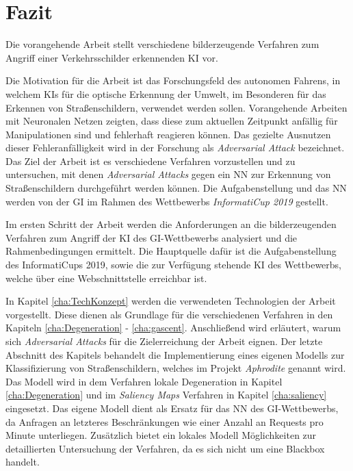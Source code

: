 \chapter{Fazit}
\label{cha:Fazit} \label{cha:Schluss}
Die vorangehende Arbeit stellt verschiedene bilderzeugende Verfahren zum Angriff einer Verkehrsschilder erkennenden \ac{KI} vor.

Die Motivation für die Arbeit ist das Forschungsfeld des autonomen Fahrens, in welchem \acp{KI} für die optische Erkennung der Umwelt, im Besonderen für das Erkennen von Straßenschildern, verwendet werden sollen. 
Vorangehende Arbeiten mit Neuronalen Netzen zeigten, dass diese zum aktuellen Zeitpunkt anfällig für Manipulationen sind und fehlerhaft reagieren können. 
Das gezielte Ausnutzen dieser Fehleranfälligkeit wird in der Forschung als \textit{Adversarial Attack} bezeichnet. 
Das Ziel der Arbeit ist es verschiedene Verfahren vorzustellen und zu untersuchen, mit denen \textit{Adversarial Attacks} gegen ein \ac{NN} zur Erkennung von Straßenschildern durchgeführt werden können. 
Die Aufgabenstellung und das \ac{NN} werden von der \acl{GI} im Rahmen des Wettbewerbs \textit{InformatiCup 2019} gestellt.

Im ersten Schritt der Arbeit werden die Anforderungen an die bilderzeugenden Verfahren zum Angriff der \ac{KI} des \ac{GI}-Wettbewerbs analysiert und die Rahmenbedingungen ermittelt. 
Die Hauptquelle dafür ist die Aufgabenstellung des InformatiCups 2019, sowie die zur Verfügung stehende \ac{KI} des Wettbewerbs, welche über eine Webschnittstelle erreichbar ist.

In Kapitel \ref{cha:TechKonzept} werden die verwendeten Technologien der Arbeit vorgestellt. 
Diese dienen als Grundlage für die verschiedenen Verfahren in den Kapiteln \ref{cha:Degeneration} - \ref{cha:gascent}. Anschließend wird erläutert, warum sich \textit{Adversarial Attacks} für die Zielerreichung der Arbeit eignen. 
Der letzte Abschnitt des Kapitels behandelt die Implementierung eines eigenen Modells zur Klassifizierung von Straßenschildern, welches im Projekt \textit{Aphrodite} genannt wird. 
Das Modell wird in dem Verfahren lokale Degeneration in Kapitel \ref{cha:Degeneration} und im \textit{Saliency Maps} Verfahren in Kapitel \ref{cha:saliency} eingesetzt. 
Das eigene Modell dient als Ersatz für das \ac{NN} des \ac{GI}-Wettbewerbs, da Anfragen an letzteres Beschränkungen wie einer Anzahl an Requests pro Minute unterliegen. 
Zusätzlich bietet ein lokales Modell Möglichkeiten zur detaillierten Untersuchung der Verfahren, da es sich nicht um eine Blackbox handelt.

